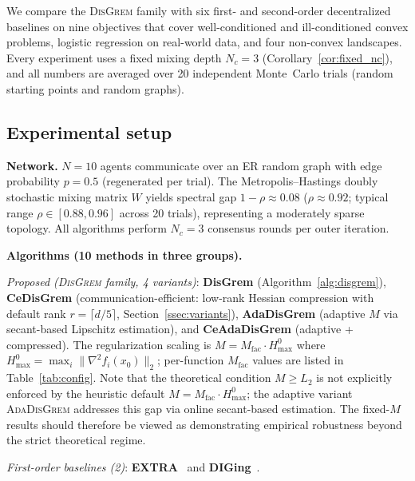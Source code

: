\documentclass[10pt,twocolumn,letterpaper]{article}
\theoremstyle{compact}
\theoremstyle{compactremark}
\begin{document}
	We compare the \textsc{DisGrem} family with six first- and
	second-order decentralized baselines on nine objectives that
	cover well-conditioned and ill-conditioned convex problems,
	logistic regression on real-world data, and four non-convex landscapes.
	Every experiment uses a fixed mixing depth $N_c{=}3$
	(Corollary~\ref{cor:fixed_nc}), and all numbers are averaged
	over 20 independent Monte~Carlo trials (random starting points
	and random graphs).
	
	\subsection{Experimental setup}\label{ssec:setup}
	
	\noindent\textbf{Network.}
	$N{=}10$ agents communicate over an ER random graph
	with edge probability $p{=}0.5$ (regenerated per trial).
	The Metropolis--Hastings doubly stochastic mixing matrix $W$ yields
	spectral gap $1{-}\rho\approx 0.08$
	($\rho\approx 0.92$; typical range $\rho\in[0.88,0.96]$ across 20 trials),
	representing a moderately sparse topology.
	All algorithms perform $N_c{=}3$ consensus rounds per outer iteration.
	
	\noindent\textbf{Algorithms (10 methods in three groups).}
	
	\noindent\textit{Proposed (\textsc{DisGrem} family, 4 variants)}:
	\textbf{DisGrem} (Algorithm~\ref{alg:disgrem}),
	\textbf{CeDisGrem} (communication-efficient: low-rank Hessian compression
	with default rank $r{=}\lceil d/5\rceil$, Section~\ref{ssec:variants}),
	\textbf{AdaDisGrem} (adaptive $M$ via secant-based Lipschitz estimation),
	and \textbf{CeAdaDisGrem} (adaptive + compressed).
	The regularization scaling is $M = M_{\mathrm{fac}}\cdot H_{\max}^{0}$ where
	$H_{\max}^{0} = \max_i \|\nabla^2 f_i(x_0)\|_2$;
	per-function $M_{\mathrm{fac}}$ values are listed in Table~\ref{tab:config}.
	Note that the theoretical condition $M\ge L_2$ is not explicitly
	enforced by the heuristic default $M=M_{\mathrm{fac}}\cdot H_{\max}^0$;
	the adaptive variant \textsc{AdaDisGrem} addresses this gap via
	online secant-based estimation.
	The fixed-$M$ results should therefore be viewed as demonstrating
	empirical robustness beyond the strict theoretical regime.
	
	\noindent\textit{First-order baselines (2)}:
	\textbf{EXTRA}~\citep{shi2015extra} and
	\textbf{DIGing}~\citep{nedic2017diging}.
	
\end{document}
